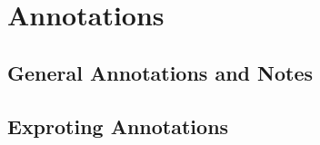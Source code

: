 \section{Annotations}

\subsection{General Annotations and Notes}

\subsection{Exproting Annotations}